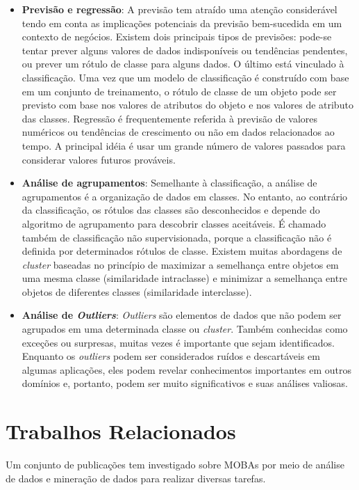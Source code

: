 \begin{itemize}
  \item 
\textbf{Previsão e regressão}: A previsão tem atraído uma atenção considerável tendo em conta as implicações potenciais da previsão bem-sucedida em um contexto de negócios. Existem dois principais tipos de previsões: pode-se tentar prever alguns valores de dados indisponíveis ou tendências pendentes, ou prever um rótulo de classe para alguns dados. O último está vinculado à classificação. Uma vez que um modelo de classificação é construído com base em um conjunto de treinamento, o rótulo de classe de um objeto pode ser previsto com base nos valores de atributos do objeto e nos valores de atributo das classes. Regressão é frequentemente referida à previsão de valores numéricos ou tendências de crescimento ou não em dados relacionados ao tempo. A principal idéia é usar um grande número de valores passados para considerar valores futuros prováveis.  
  \item 
\textbf{Análise de agrupamentos}: Semelhante à classificação, a análise de agrupamentos é a organização de dados em classes. No entanto, ao contrário da classificação, os rótulos das classes são desconhecidos e depende do algoritmo de agrupamento para descobrir classes aceitáveis. É chamado também de classificação não supervisionada, porque a classificação não é definida por determinados rótulos de classe. Existem muitas abordagens de \textit{cluster} baseadas no princípio de maximizar a semelhança entre objetos em uma mesma classe (similaridade intraclasse) e minimizar a semelhança entre objetos de diferentes classes (similaridade interclasse).
  \item 
\textbf{Análise de \textit{Outliers}}: \textit{Outliers} são elementos de dados que não podem ser agrupados em uma determinada classe ou \textit{cluster}. Também conhecidas como exceções ou surpresas, muitas vezes é importante que sejam identificados. Enquanto os \textit{outliers} podem ser considerados ruídos e descartáveis em algumas aplicações, eles podem revelar conhecimentos importantes em outros domínios e, portanto, podem ser muito significativos e suas análises valiosas.

\end{itemize}

\chapter{Trabalhos Relacionados}

Um conjunto de publicações tem investigado sobre MOBAs por meio de análise de dados e mineração de dados para realizar diversas tarefas.

